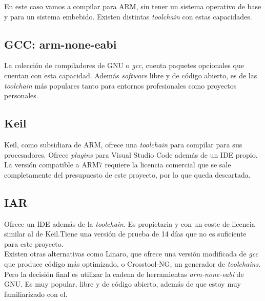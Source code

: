 En este caso vamos a compilar para ARM, sin tener un sistema operativo de base y para un sistema embebido. Existen distintas \emph{toolchain} con estas capacidades.

\subsection{GCC: arm-none-eabi}
La colección de compiladores de GNU o \emph{gcc}, cuenta paquetes opcionales que cuentan con esta capacidad. Además \emph{software} libre y de código abierto, es de las \emph{toolchain} más populares tanto para entornos profesionales como proyectos personales.

\subsection{Keil}
Keil, como subsidiara de ARM, ofrece una \emph{toolchain} para compilar para sus procesadores. Ofrece \emph{plugins} para Visual Studio Code además de un IDE propio. La versión compatible a ARM7 requiere la licencia comercial que se sale completamente del presupuesto de este proyecto, por lo que queda descartada.

\subsection{IAR}
Ofrece un IDE además de la \emph{toolchain}. Es propietaria y con un coste de licencia similar al de Keil.Tiene una versión de prueba de 14 días que no es suficiente para este proyecto.\\

Existen otras alternativas como Linaro, que ofrece una versión modificada de \emph{gcc} que produce código más optimizado, o Crosstool-NG, un generador de \emph{toolchains}. Pero la decisión final es utilizar la cadena de herramientas \emph{arm-none-eabi} de GNU. Es muy popular, libre y de código abierto, además de que estoy muy familiarizado con el.


